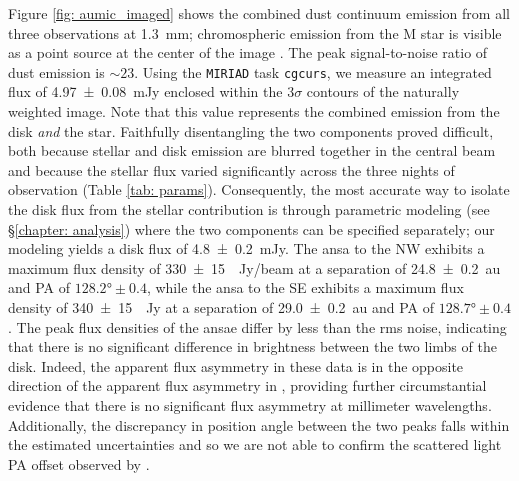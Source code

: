 \documentclass[12pt,oneside]{book}
\begin{document}
Figure \ref{fig: aumic_imaged} shows the combined dust continuum emission from all three observations at \SI{1.3}{mm}; chromospheric emission from the M star is visible as a point source at the center of the image \citep{cranmer13}. 
The peak signal-to-noise ratio of dust emission is $\sim 23$.
Using the \texttt{MIRIAD} task \texttt{cgcurs}, we measure an integrated flux of \SI{4.97 \pm 0.08}{\milli Jy} enclosed within the $3\sigma$ contours of the naturally weighted image.  
Note that this value represents the combined emission from the disk \textit{and} the star. 
Faithfully disentangling the two components proved difficult, both because stellar and disk emission are blurred together in the central beam and because the stellar flux varied significantly across the three nights of observation (Table \ref{tab: params}).
Consequently, the most accurate way to isolate the disk flux from the stellar contribution is through parametric modeling (see \S \ref{chapter: analysis}) where the two components can be specified separately; our modeling yields a disk flux of \SI{4.8 \pm 0.2}{mJy}.
The ansa to the NW exhibits a maximum flux density of \SI{330 \pm 15}{\mu Jy/beam} at a separation of \SI{24.8 \pm 0.2}{au} and PA of $\ang[angle-symbol-over-decimal]{128.2} \pm 0.4$, while the ansa to the SE exhibits a maximum flux density of \SI{340 \pm 15}{\mu Jy} at a separation of \SI{29.0 \pm 0.2}{au} and PA of $\ang[angle-symbol-over-decimal]{128.7} \pm 0.4$. 
The peak flux densities of the ansae differ by less than the rms noise, indicating that there is no significant difference in brightness between the two limbs of the disk.
Indeed, the apparent flux asymmetry in these data is in the opposite direction of the apparent flux asymmetry in \cite{macgregor13}, providing further circumstantial evidence that there is no significant flux asymmetry at millimeter wavelengths. 
Additionally, the discrepancy in position angle between the two peaks falls within the estimated uncertainties and so we are not able to confirm the scattered light PA offset observed by \cite{boccaletti15}. 
\end{document}
